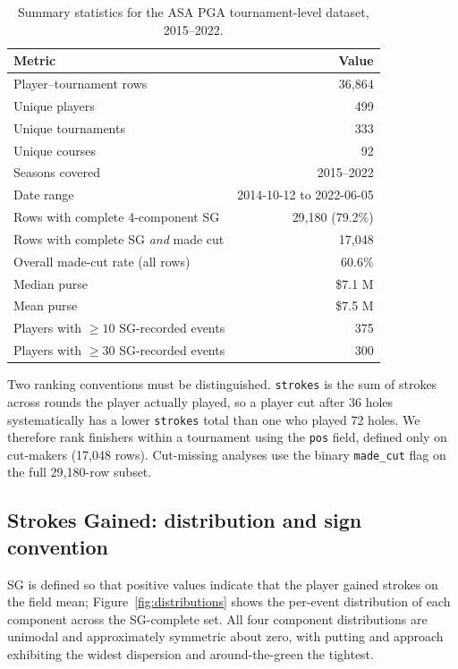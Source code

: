 \documentclass[11pt]{article}
\begin{document}
\begin{table}[t]
\centering
\small
\caption{Summary statistics for the ASA PGA tournament-level dataset, 2015--2022.}
\label{tab:profile}
\begin{tabular}{lr}
\toprule
\textbf{Metric} & \textbf{Value} \\
\midrule
Player--tournament rows                     & 36{,}864 \\
Unique players                              & 499 \\
Unique tournaments                          & 333 \\
Unique courses                              & 92 \\
Seasons covered                             & 2015--2022 \\
Date range                                  & 2014-10-12 to 2022-06-05 \\
Rows with complete 4-component SG           & 29{,}180 (79.2\%) \\
Rows with complete SG \emph{and} made cut   & 17{,}048 \\
Overall made-cut rate (all rows)            & 60.6\% \\
Median purse                                & \$7.1 M \\
Mean purse                                  & \$7.5 M \\
Players with $\ge 10$ SG-recorded events    & 375 \\
Players with $\ge 30$ SG-recorded events    & 300 \\
\bottomrule
\end{tabular}
\end{table}

Two ranking conventions must be distinguished.  \texttt{strokes} is the sum of strokes across rounds the player actually played, so a player cut after 36 holes systematically has a lower \texttt{strokes} total than one who played 72 holes.  We therefore rank finishers within a tournament using the \texttt{pos} field, defined only on cut-makers (17{,}048 rows).  Cut-missing analyses use the binary \texttt{made\_cut} flag on the full 29{,}180-row subset.

\subsection{Strokes Gained: distribution and sign convention}

SG is defined so that positive values indicate that the player gained strokes on the field mean; Figure~\ref{fig:distributions} shows the per-event distribution of each component across the SG-complete set.  All four component distributions are unimodal and approximately symmetric about zero, with putting and approach exhibiting the widest dispersion and around-the-green the tightest.
\end{document}
